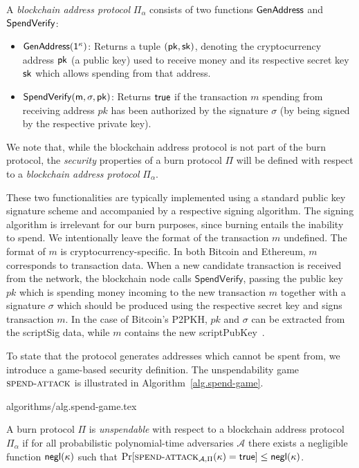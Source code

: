\begin{definition}
  A \emph{blockchain address protocol} $\Pi_\alpha$ consists of two functions $\sf{GenAddress}$ and $\sf{SpendVerify}$:

  \begin{itemize}
    \item $\sf{GenAddress}(1^\kappa)$: Returns a tuple $(\sf{pk}, \sf{sk})$, denoting the cryptocurrency address $\sf{pk}$ (a public key) used to receive money and its respective secret key $\sf{sk}$ which allows spending from that address.

    \item $\sf{SpendVerify}(m, \sigma, pk)$: Returns $\sf{true}$ if the transaction $m$ spending from receiving address $pk$ has been authorized by the signature $\sigma$ (by being signed by the respective private key).
  \end{itemize}
\end{definition}

We note that, while the blockchain address protocol is not part of the burn protocol, the \emph{security} properties of a burn protocol $\Pi$ will be defined with respect to a \emph{blockchain address protocol} $\Pi_\alpha$.

These two functionalities are typically implemented using a standard public key signature scheme and accompanied by a respective signing algorithm. The signing algorithm is irrelevant for our burn purposes, since burning entails the inability to spend. We intentionally leave the format of the transaction $m$ undefined. The format of $m$ is cryptocurrency-specific. In both Bitcoin and Ethereum, $m$ corresponds to transaction data. When a new candidate transaction is received from the network, the blockchain node calls $\textsf{SpendVerify}$, passing the public key $pk$ which is spending money incoming to the new transaction $m$ together with a signature $\sigma$ which should be produced using the respective secret key and signs transaction $m$. In the case of Bitcoin's P2PKH, $pk$ and $\sigma$ can be extracted from the scriptSig data, while $m$ contains the new scriptPubKey~\cite{bitcoin-dev-guide}.

To state that the protocol generates addresses which cannot be spent from, we introduce a game-based security definition. The unspendability game $\textsc{spend}\-\text{-}\-\textsc{attack}$ is illustrated in Algorithm~\ref{alg.spend-game}.

{algorithms/alg.spend-game.tex}

\begin{definition}[Unspendability]
  A burn protocol $\Pi$ is \emph{unspendable} with respect to a blockchain address protocol $\Pi_\alpha$ if
  for all probabilistic polynomial-time adversaries $\mathcal{A}$ there exists a negligible function $\textsf{negl}(\kappa)$ such that
  $
    \Pr[\textsc{spend}\-\text{-}\-\textsc{attack}_{\mathcal{A}, \Pi}(\kappa) = \textsf{true}] \leq \textsf{negl}(\kappa)
  $.
\end{definition}

